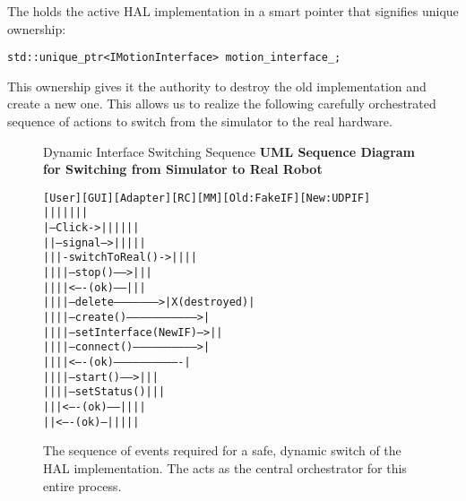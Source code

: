 The  holds the active HAL implementation in a smart pointer that signifies unique ownership:
\begin{verbatim}
std::unique_ptr<IMotionInterface> motion_interface_;
\end{verbatim}

This ownership gives it the authority to destroy the old implementation and create a new one. This allows us to realize the following carefully orchestrated sequence of actions to switch from the simulator to the real hardware.

\begin{figure}[h!]
    \centering
    \begin{infobox}{Dynamic Interface Switching Sequence}
        \textbf{UML Sequence Diagram for Switching from Simulator to Real Robot}
        {\footnotesize
        \begin{alltt}
[User]  [GUI]      [Adapter]     [RC]           [MM]      [Old: FakeIF]  [New: UDPIF]
  |       |          |             |              |             |              |
  |--Click->|          |             |              |             |              |
  |       |--signal-->|             |              |             |              |
  |       |          |-switchToReal()->|              |             |              |
  |       |          |             |--stop()------>|             |              |
  |       |          |             |<----(ok)------|             |              |
  |       |          |             |--delete-------------------->| X(destroyed) |
  |       |          |             |--create()--------------------------------->|
  |       |          |             |--setInterface(NewIF)-->|             |
  |       |          |             |--connect()------------------------------>|
  |       |          |             |<----(ok)-------------------------------|
  |       |          |             |--start()------>|             |              |
  |       |          |             |--setStatus()  |             |              |
  |       |          |<----(ok)-----|              |             |              |
  |       |<----(ok)--|             |              |             |              |
        \end{alltt}
        }
    \end{infobox}
            \vspace{0.3cm}
    \caption{The sequence of events required for a safe, dynamic switch of the HAL implementation. The  acts as the central orchestrator for this entire process.}
    \label{fig:dynamic_switch_sequence}
\end{figure}


